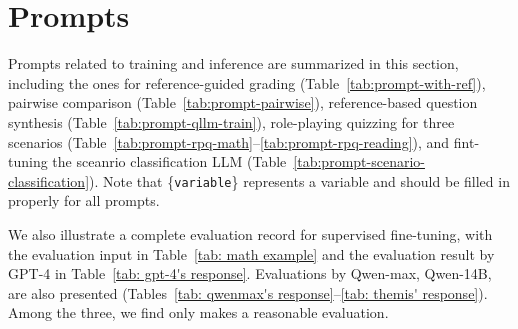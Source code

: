 \section{Prompts}
\label{app:prompts}

Prompts related to \modelname training and inference are summarized in this section, including the ones for reference-guided grading (Table~\ref{tab:prompt-with-ref}), pairwise comparison (Table~\ref{tab:prompt-pairwise}), reference-based question synthesis (Table~\ref{tab:prompt-qllm-train}), role-playing quizzing for three scenarios (Table~\ref{tab:prompt-rpq-math}--\ref{tab:prompt-rpq-reading}), and fint-tuning the sceanrio classification LLM (Table~\ref{tab:prompt-scenario-classification}). Note that \{\texttt{variable}\} represents a variable and should be filled in properly for all prompts. 

We also illustrate a complete evaluation record for supervised fine-tuning, with the evaluation input in Table~\ref{tab: math example} and the evaluation result by GPT-4 in Table~\ref{tab: gpt-4's response}. Evaluations by Qwen-max, Qwen-14B, \modelname are also presented (Tables~\ref{tab: qwenmax's response}--\ref{tab: themis' response}). Among the three, we find only \modelname makes a reasonable evaluation. 





